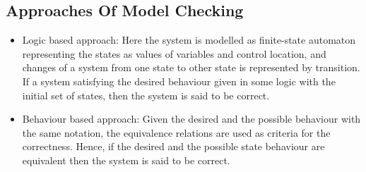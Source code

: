 \documentclass[a4paper,12pt]{extarticle}
\begin{document}
\subsection{Approaches Of Model Checking}
\label{Appr to model check}
\begin{itemize}
\item Logic based approach: Here the system is modelled as finite-state automaton representing the states as values of variables and control location, and changes of a system from one state to other state is represented by transition. If a system satisfying the desired behaviour given in some logic with the initial set of states, then the system is said to be correct.
\item Behaviour based approach: Given the desired and the possible behaviour with the same notation, the equivalence relations are used as criteria for the correctness. Hence, if the desired and the possible state behaviour are equivalent then the system is said to be correct.
\end{itemize}
\end{document}
